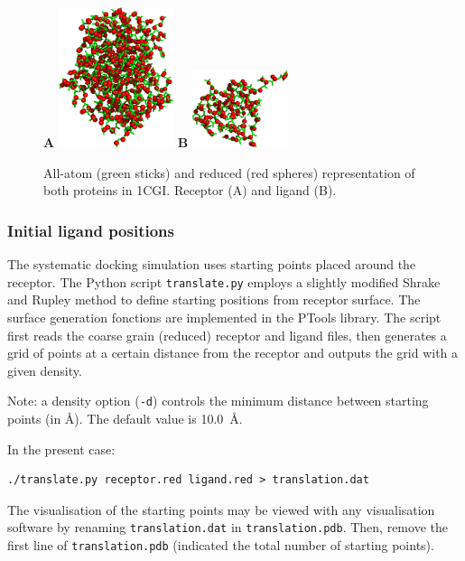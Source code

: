 \documentclass[12pt,a4paper]{article}
\begin{document}
\begin{figure}[htbp]
\center
{\textbf A}
\includegraphics*[width=0.30\textwidth]{img/1CGI_receptor.png}
\hspace*{2cm}
{\textbf B}
\includegraphics*[width=0.25\textwidth]{img/1CGI_ligand.png}
\caption{All-atom (green sticks) and reduced (red spheres) representation of both proteins in 1CGI. Receptor (A) and ligand (B).}
\end{figure}

\subsubsection{Initial ligand positions}

The systematic docking simulation uses starting points placed around the
receptor.  The Python script {\tt translate.py} employs a slightly modified
Shrake and Rupley \cite{shrake1973} method to define starting positions
from receptor surface.  The surface generation fonctions are implemented in
the PTools library. The script first reads the coarse grain (reduced)
receptor and ligand files, then generates a grid of points at a certain
distance from the receptor and outputs the grid with a given density.

Note: a density option ({\tt -d}) controls the minimum distance between starting
points (in \AA). The default value is 10.0~\AA. 

In the present case:
\begin{verbatim}
./translate.py receptor.red ligand.red > translation.dat
\end{verbatim}

The visualisation of the starting points may be viewed with any visualisation software by renaming {\tt translation.dat} in {\tt translation.pdb}.
Then, remove the first line of {\tt translation.pdb} (indicated the total number of starting points).
\end{document}
